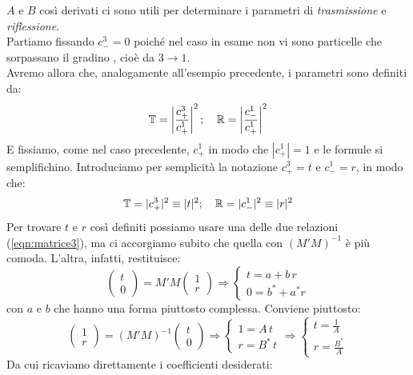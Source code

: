 \documentclass[../../FisicaTeorica.tex]{subfiles}
\begin{document}
$A$ e $B$ così derivati ci sono utili per determinare i parametri di \textit{trasmissione} e \textit{riflessione}.\\
Partiamo fissando $c^3_-=0$ poiché nel caso in esame non vi sono particelle che sorpassano il gradino , cioè da $3\to 1$.\\
Avremo allora che, analogamente all'esempio precedente, i parametri sono definiti da:
\[
\bm{\mathbb{T}}=\left|\frac{c^3_+}{c^1_+}\right|^2;\quad \mathbb{R}=\left|\frac{c^1_-}{c^1_+}\right|^2
\]
E fissiamo, come nel caso precedente, $c^1_+$ in modo che $|c^1_+|=1$ e le formule si semplifichino. Introduciamo per semplicità la notazione $c^3_+=t$ e $c^1_-=r$, in modo che:
\[
\mathbb{T}=|c^3_+|^2\equiv|t|^2; \quad \mathbb{R}=|c^1_-|^2\equiv |r|^2
\]
Per trovare $t$ e $r$ così definiti possiamo usare una delle due relazioni (\ref{eqn:matrice3}), ma ci accorgiamo subito che quella con $(M'M)^{-1}$ è più comoda. L'altra, infatti, restituisce:
\[
\begin{pmatrix}
t\\
0
\end{pmatrix} = M'M \begin{pmatrix}
1\\
r
\end{pmatrix} \Rightarrow
\begin{cases}
t=a+b\,r\\
0=b^*+a^*r
\end{cases}
\] 
con $a$ e $b$ che hanno una forma piuttosto complessa. Conviene piuttosto:
\[
\begin{pmatrix}
1\\
r
\end{pmatrix} = (M'M)^{-1}\begin{pmatrix}
t\\
0
\end{pmatrix} \Rightarrow 
\begin{cases}
1=A\,t\\
r=B^*\,t
\end{cases}\Rightarrow 
\begin{cases}
t=\frac{1}{A}\\
r=\frac{B^*}{A}
\end{cases}
\]
Da cui ricaviamo direttamente i coefficienti desiderati:%
\end{document}
